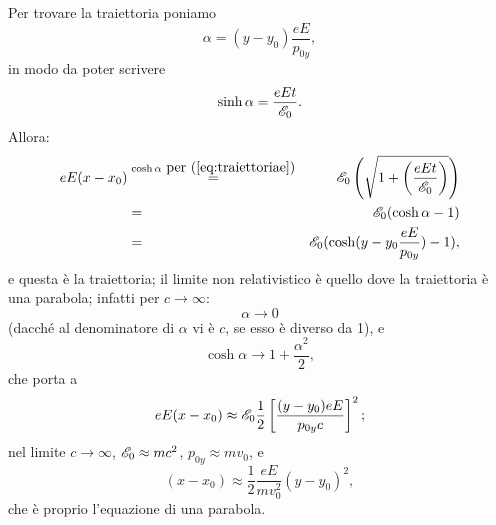 \begin{esempio}
Per trovare la traiettoria poniamo
$$
\alpha = (y - y_0) \frac{e E}{p_{0y}},
$$
in modo da poter scrivere
\begin{equation}
  \sinh \alpha = \frac{e E t}{\mathscr{E}_0}. \label{eq:traiettoriae}
\end{equation}
Allora:
\begin{eqnarray*}
  e E (x - x_0) &\stackrel{\cosh \alpha \mbox{ per
      (\ref{eq:traiettoriae})}}{=}& \mathscr{E}_0 \left(\sqrt{ 1 +
      \left(\frac{e E t}{\mathscr{E}_0}\right)}\right) \\ & = & \mathscr{E}_0
  (\cosh \alpha - 1)  \\ & = & \mathscr{E}_0 (\cosh (y - y_0  \frac{e
    E}{p_{0y}}) - 1),
\end{eqnarray*}
e questa \`e la traiettoria; il limite non relativistico \`e quello
dove la traiettoria \`e una parabola; infatti per $c \rightarrow
\infty$:
$$
\alpha \rightarrow 0
$$
(dacch\'e al denominatore di $\alpha$ vi \`e $c$, se esso \`e diverso
da 1), e
$$
\cosh \alpha \rightarrow 1 + \frac{\alpha^2}{2},
$$
che porta a
$$
e E (x- x_0) \approx \mathscr{E}_0 \frac{1}{2} \left[ \frac{(y - y_0) e
    E}{p_{0y} c } \right]^2;
$$
nel limite $c \rightarrow \infty$, $\mathscr{E}_0 \approx mc^2$, $p_{0y}
\approx m v_0$, e
$$
(x- x_0) \approx \frac{1}{2} \frac{e E}{m v_0^2}(y - y_0)^2,
$$
che \`e proprio l'equazione di una parabola.
\end{esempio}










%
